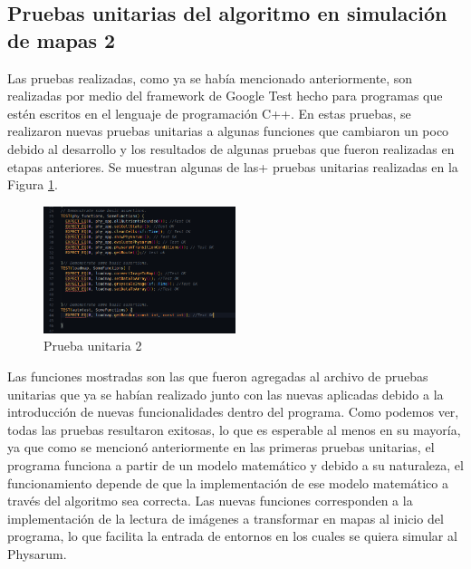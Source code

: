 \subsection{Pruebas unitarias del algoritmo en simulaci\'on de mapas 2}
    Las pruebas realizadas, como ya se hab\'ia mencionado
        anteriormente, son realizadas por medio del framework de
        Google Test hecho para programas que est\'en escritos en el
        lenguaje de programaci\'on C++.
        \vskip 0.5cm
    En estas pruebas, se realizaron nuevas pruebas unitarias a
        algunas funciones que cambiaron un poco debido al
        desarrollo y los resultados de algunas pruebas que fueron
        realizadas en etapas anteriores. Se muestran algunas de las+
        pruebas unitarias realizadas en la Figura \ref{fig:Prueba unitaria 2}.
        \vskip 0.5cm
    \begin{figure}[htbp]
        \centering
        \includegraphics[width=0.5\textwidth]{./images/Pruebas/simulador/image041.png}
        \caption{Prueba unitaria 2}
        \label{fig:Prueba unitaria 2}
    \end{figure}
    Las funciones mostradas son las que fueron agregadas al
        archivo de pruebas unitarias que ya se hab\'ian realizado junto
        con las nuevas aplicadas debido a la introducci\'on de nuevas
        funcionalidades dentro del programa. Como podemos ver,
        todas las pruebas resultaron exitosas, lo que es esperable al
        menos en su mayor\'ia, ya que como se mencion\'o anteriormente en las primeras pruebas unitarias, el programa
        funciona a partir de un modelo matem\'atico y debido a su
        naturaleza, el funcionamiento depende de que la
        implementaci\'on de ese modelo matem\'atico a trav\'es del
        algoritmo sea correcta.
        \vskip 0.5cm
    Las nuevas funciones corresponden a la implementaci\'on de
        la lectura de im\'agenes a transformar en mapas al inicio del
        programa, lo que facilita la entrada de entornos en los cuales
        se quiera simular al Physarum.
        \vskip 0.5cm